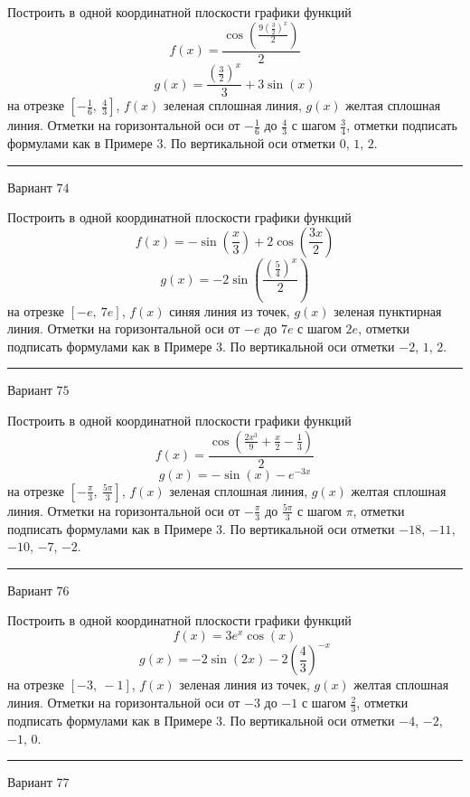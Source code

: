 \documentclass[11pt]{report}
\begin{document}
Построить в одной координатной плоскости графики функций $$f(x) = \frac{\cos{\left(\frac{9 \left(\frac{3}{2}\right)^{x}}{2} \right)}}{2}$$ $$g(x) = \frac{\left(\frac{3}{2}\right)^{x}}{3} + 3 \sin{\left(x \right)}$$ на отрезке $\left[- \frac{1}{6}, \  \frac{4}{3}\right]$, $f(x)$ зеленая сплошная линия, $g(x)$ желтая сплошная линия. Отметки на горизонтальной оси от $- \frac{1}{6}$ до $\frac{4}{3}$ с шагом $\frac{3}{4}$, отметки подписать формулами как в Примере 3. По вертикальной оси отметки $0$, $1$, $2$.
\begin{center}
\noindent\rule{8cm}{0.4pt}
\end{center}
Вариант $74$


Построить в одной координатной плоскости графики функций $$f(x) = - \sin{\left(\frac{x}{3} \right)} + 2 \cos{\left(\frac{3 x}{2} \right)}$$ $$g(x) = - 2 \sin{\left(\frac{\left(\frac{5}{4}\right)^{x}}{2} \right)}$$ на отрезке $\left[- e, \  7 e\right]$, $f(x)$ синяя линия из точек, $g(x)$ зеленая пунктирная линия. Отметки на горизонтальной оси от $- e$ до $7 e$ с шагом $2 e$, отметки подписать формулами как в Примере 3. По вертикальной оси отметки $-2$, $1$, $2$.
\begin{center}
\noindent\rule{8cm}{0.4pt}
\end{center}
Вариант $75$


Построить в одной координатной плоскости графики функций $$f(x) = \frac{\cos{\left(\frac{2 x^{3}}{9} + \frac{x}{2} - \frac{1}{3} \right)}}{2}$$ $$g(x) = - \sin{\left(x \right)} - e^{- 3 x}$$ на отрезке $\left[- \frac{\pi}{3}, \  \frac{5 \pi}{3}\right]$, $f(x)$ зеленая сплошная линия, $g(x)$ желтая сплошная линия. Отметки на горизонтальной оси от $- \frac{\pi}{3}$ до $\frac{5 \pi}{3}$ с шагом $\pi$, отметки подписать формулами как в Примере 3. По вертикальной оси отметки $-18$, $-11$, $-10$, $-7$, $-2$.
\begin{center}
\noindent\rule{8cm}{0.4pt}
\end{center}
Вариант $76$


Построить в одной координатной плоскости графики функций $$f(x) = 3 e^{x} \cos{\left(x \right)}$$ $$g(x) = - 2 \sin{\left(2 x \right)} - 2 \left(\frac{4}{3}\right)^{- x}$$ на отрезке $\left[-3, \  -1\right]$, $f(x)$ зеленая линия из точек, $g(x)$ желтая сплошная линия. Отметки на горизонтальной оси от $-3$ до $-1$ с шагом $\frac{2}{3}$, отметки подписать формулами как в Примере 3. По вертикальной оси отметки $-4$, $-2$, $-1$, $0$.
\begin{center}
\noindent\rule{8cm}{0.4pt}
\end{center}
Вариант $77$
\end{document}
